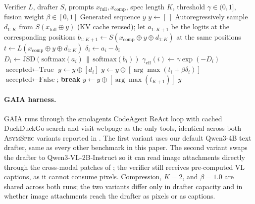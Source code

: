 \documentclass[11pt]{article}
\theoremstyle{plain}
\theoremstyle{definition}
\begin{document}
\begin{algorithm}[t]
\caption{\textsc{AsymSpec} Decoding}
\label{alg:asymSpec}
\footnotesize
\begin{algorithmic}[1]
\Require Verifier $L$, drafter $S$, prompts $x_{\text{full}}, x_{\text{comp}}$, spec length $K$, threshold $\gamma\in(0,1]$, fusion weight $\beta\in[0,1]$
\Ensure Generated sequence $y$
\State $y \gets [\,]$
    \State Autoregressively sample $d_{1:K}$ from $S(x_{\text{full}} \oplus y)$ (KV cache reused); let $a_{1:K+1}$ be the logits at the corresponding positions
    \State $b_{1:K+1} \gets S(x_{\text{comp}} \oplus y \oplus d_{1:K})$ at the same positions
    \State $t \gets L(x_{\text{comp}} \oplus y \oplus d_{1:K})$
        \State $\delta_i \gets a_i - b_i$
        \State $D_i \gets \mathrm{JSD}(\mathrm{softmax}(a_i)\,\|\,\mathrm{softmax}(b_i))$
        \State $\gamma_{\text{eff}}(i) \gets \gamma \exp(-D_i)$
    \EndFor
    \State $\text{accepted} \gets \text{True}$
            \State $y \gets y \oplus [d_i]$
        \Else
            \State $y \gets y \oplus [\arg\max(t_i + \beta\delta_i)]$
            \State $\text{accepted} \gets \text{False}$; \textbf{break}
        \EndIf
    \EndFor
        \State $y \gets y \oplus [\arg\max(t_{K+1})]$
    \EndIf
\EndWhile
\State \Return $y$
\end{algorithmic}
\end{algorithm}

\paragraph{GAIA harness.}
GAIA runs through the smolagents CodeAgent ReAct loop with cached DuckDuckGo search and visit-webpage as the only tools, identical across both \textsc{AsymSpec} variants reported in . The first variant uses our default Qwen3-4B text drafter, same as every other benchmark in this paper. The second variant swaps the drafter to Qwen3-VL-2B-Instruct so it can read image attachments directly through the cross-modal patches of ; the verifier still receives pre-computed VL captions, as it cannot consume pixels. Compression, $K{=}2$, and $\beta{=}1.0$ are shared across both runs; the two variants differ only in drafter capacity and in whether image attachments reach the drafter as pixels or as captions.
\end{document}
